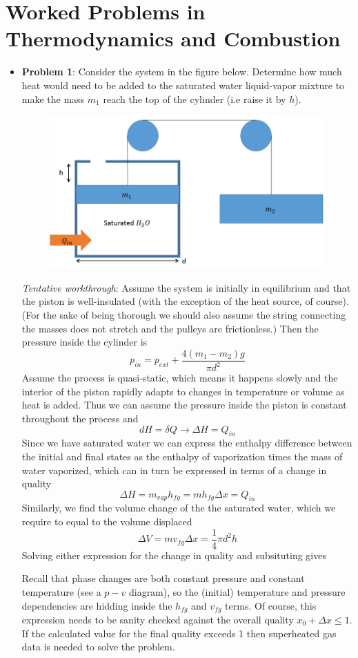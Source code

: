 \documentclass[11pt]{article}
\newcommand{\Item}[1]{\item \textbf{#1}:}
\newcommand{\CenteredBoxed}[1]{\begin{center}\boxed{#1}\end{center}}
\newcommand{\Problem}[1]{\Item{Problem #1}}
\begin{document}
\section{Worked Problems in Thermodynamics and Combustion}
\begin{itemize}
\Problem{1} Consider the system in the figure below. Determine how much heat would need to be added to the saturated water liquid-vapor mixture to make the mass $m_1$ reach the top of the cylinder (i.e raise it by $h$).
\begin{figure}[h]\center\includegraphics[scale=0.5]{Graphics/mass_system.PNG}\end{figure}

\emph{Tentative workthrough}: Assume the system is initially in equilibrium and that the piston is well-insulated (with the exception of the heat source, of course). (For the sake of being thorough we should also assume the string connecting the masses does not stretch and the pulleys are frictionless.) Then the pressure inside the cylinder is
$$p_{in} = p_{ext} + \frac{4(m_1-m_2)g}{\pi d^2}$$
Assume the process is quasi-static, which means it happens slowly and the interior of the piston rapidly adapts to changes in temperature or volume as heat is added. Thus we can assume the pressure inside the piston is constant throughout the process and
$$dH = \delta Q\to \Delta H = Q_{in}$$
Since we have saturated water we can express the enthalpy difference between the initial and final states as the enthalpy of vaporization times the mass of water vaporized, which can in turn be expressed in terms of a change in quality
$$\Delta H = m_{vap}h_{fg} = mh_{fg}\Delta x = Q_{in}$$
Similarly, we find the volume change of the the saturated water, which we require to equal to the volume displaced
$$\Delta V = mv_{fg}\Delta x = \frac{1}{4}\pi d^2h$$
Solving either expression for the change in quality and subsituting gives
\CenteredBoxed{Q_{in} = \frac{h_{fg}}{v_{fg}}\frac{1}{4}\pi d^2h}
Recall that phase changes are both constant pressure and constant temperature (see a $p-v$ diagram), so the (initial) temperature and pressure dependencies are hidding inside the $h_{fg}$ and $v_{fg}$ terms. Of course, this expression needs to be sanity checked against the overall quality $x_0+\Delta x \leq1$. If the calculated value for the final quality exceeds 1 then superheated gas data is needed to solve the problem.\\


\end{itemize}
\end{document}
